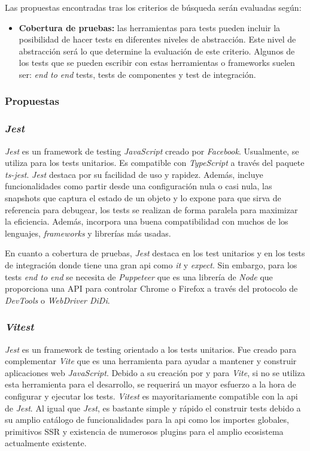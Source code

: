 Las propuestas encontradas tras los criterios de búsqueda serán evaluadas según:

\begin{itemize}
    \item \textbf{Cobertura de pruebas:} las herramientas para tests pueden incluir la posibilidad de hacer tests en diferentes niveles de abstracción. Este nivel de abstracción será lo que determine la evaluación de este criterio. Algunos de los tests que se pueden escribir con estas herramientas o frameworks suelen ser: \textit{end to end} tests, tests de componentes y test de integración.
\end{itemize}

\subsubsection{Propuestas}

\subsubsection{\textit{Jest}}

\textit{Jest} es un framework de testing \textit{JavaScript} creado por \textit{Facebook}. Usualmente, se utiliza para los tests unitarios. Es compatible con \textit{TypeScript} a través del paquete \textit{ts-jest}. \textit{Jest} destaca por su facilidad de uso y rapidez. Además, incluye funcionalidades como partir desde una configuración nula o casi nula, las snapshots que captura el estado de un objeto y lo expone para que sirva de referencia para debugear, los tests se realizan de forma paralela para maximizar la eficiencia. Además, incorpora una buena compatibilidad con muchos de los lenguajes, \textit{frameworks} y librerías más usadas.

En cuanto a cobertura de pruebas, \textit{Jest} destaca en los test unitarios y en los tests de integración donde tiene una gran api como \textit{it} y \textit{expect}. Sin embargo, para los tests \textit{end to end} se necesita de \textit{Puppeteer} que es una librería de \textit{Node} que proporciona una API para controlar Chrome o Firefox a través del protocolo de \textit{DevTools} o \textit{WebDriver DiDi}.

\subsubsection{\textit{Vitest}}

\textit{Jest} es un framework de testing orientado a los tests unitarios. Fue creado para complementar \textit{Vite} que es una herramienta para ayudar a mantener y construir aplicaciones web \textit{JavaScript}. Debido a su creación por y para \textit{Vite}, si no se utiliza esta herramienta para el desarrollo, se requerirá un mayor esfuerzo a la hora de configurar y ejecutar los tests. \textit{Vitest} es mayoritariamente compatible con la api de \textit{Jest}. Al igual que \textit{Jest}, es bastante simple y rápido el construir tests debido a su amplio catálogo de funcionalidades para la api como los importes globales, primitivos SSR y existencia de numerosos plugins para el amplio ecosistema actualmente existente.

